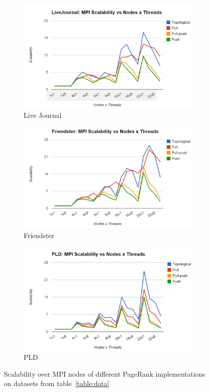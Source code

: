 \documentclass[letterpaper,11pt,onecolumn]{article}
\begin{document}
\begin{figure}
\begin{subfigure}{.33\textwidth}
  \centering
  \includegraphics[width=.99\linewidth]{LiveJournalMPIScalability}
  \caption{Live Journal}
  \label{fig:lgtime}
\end{subfigure}%
\begin{subfigure}{.33\textwidth}
  \centering
  \includegraphics[width=.99\linewidth]{FriendsterMPIScalability}
  \caption{Friendster}
  \label{fig:ftime}
\end{subfigure}
\begin{subfigure}{.33\textwidth}
  \centering
  \includegraphics[width=.99\linewidth]{PLDMPIScalability}
  \caption{PLD}
  \label{fig:ftime}
\end{subfigure}
\caption{Scalability over MPI nodes of different PageRank implementations on datasets from table~\ref{table:data}}
\label{fig:scMPI}
\end{figure}
\end{document}
